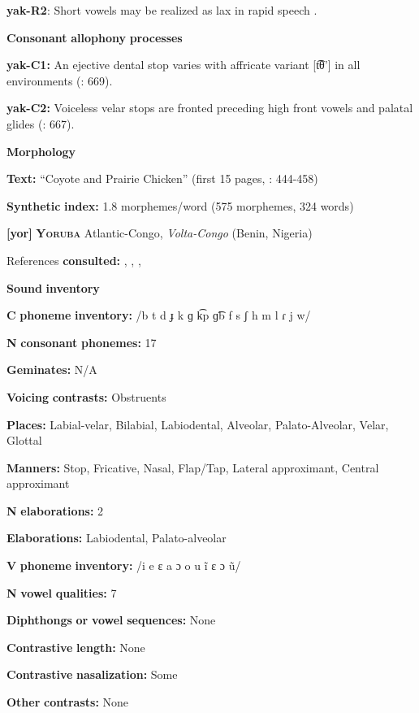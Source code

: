 \textbf{yak-R2}: Short vowels may be realized as lax in rapid speech \citep[40]{Jansen2010}.

\textbf{Consonant} \textbf{allophony} \textbf{processes}

\textbf{yak-C1:} An ejective dental stop varies with affricate variant [t͡θ’] in all environments (\citealt{RigsbyRude1996}: 669).

\textbf{yak-C2:} Voiceless velar stops are fronted preceding high front vowels and palatal glides (\citealt{RigsbyRude1996}: 667).

\textbf{Morphology}

\textbf{Text:} “Coyote and Prairie Chicken” (first 15 pages, \citealt{Jansen2010}: 444-458)

\textbf{Synthetic} \textbf{index:} 1.8 morphemes/word (575 morphemes, 324 words)

\textbf{[yor]}   \textbf{\textsc{Yoruba}}  Atlantic-Congo, \textit{Volta-Congo} (Benin, Nigeria)

References \textbf{consulted:} \citet{Bamgbose1966}, \citet{Rowlands1969}, \citet{Seidl2000}, \citet{Siertsema1959}

\textbf{Sound} \textbf{inventory}

\textbf{C} \textbf{phoneme} \textbf{inventory:} /b t d ɟ k ɡ k͡p ɡ͡b f s ʃ h m l ɾ j w/

\textbf{N} \textbf{consonant} \textbf{phonemes:} 17

\textbf{Geminates:} N/A

\textbf{Voicing} \textbf{contrasts:} Obstruents

\textbf{Places:} Labial-velar, Bilabial, Labiodental, Alveolar, Palato-Alveolar, Velar, Glottal

\textbf{Manners:} Stop, Fricative, Nasal, Flap/Tap, Lateral approximant, Central approximant

\textbf{N} \textbf{elaborations:} 2

\textbf{Elaborations:} Labiodental, Palato-alveolar

\textbf{V} \textbf{phoneme} \textbf{inventory:} /i e ɛ a ɔ o u ĩ ɛ ɔ ũ/

\textbf{N} \textbf{vowel} \textbf{qualities:} 7

\textbf{Diphthongs} \textbf{or} \textbf{vowel} \textbf{sequences:} None

\textbf{Contrastive} \textbf{length:} None

\textbf{Contrastive} \textbf{nasalization:} Some

\textbf{Other} \textbf{contrasts:} None

